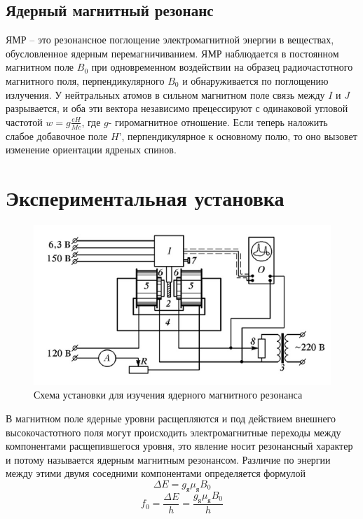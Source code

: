 \documentclass[a4paper, 12pt]{article}%
\begin{document}
\subsection{Ядерный магнитный резонанс}
ЯМР – это резонансное поглощение электромагнитной энергии в веществах, обусловленное ядерным перемагничиванием. ЯМР наблюдается в постоянном магнитном поле $B_0$ при одновременном воздействии на образец радиочастотного магнитного поля, перпендикулярного $B_0$ и обнаруживается по поглощению излучения. У нейтральных атомов в сильном магнитном поле связь между $I$ и $J$ разрывается, и оба эти вектора независимо прецессируют с одинаковой угловой частотой $w=g\frac{eH}{Mc}$, где $g$- гиромагнитное отношение. Если теперь наложить слабое добавочное поле $H’$, перпендикулярное к основному полю, то оно вызовет изменение ориентации ядреных спинов.

\section{Экспериментальная установка}
\begin{figure}[h]
\begin{center}
\includegraphics[width = \textwidth]{1.jpg}
\caption{Схема установки для изучения ядерного магнитного резонанса}
\end{center}
\end{figure}
В магнитном поле ядерные уровни расщепляются и под действием внешнего высокочастотного поля могут происходить электромагнитные переходы между компонентами расщепившегося уровня, это явление носит резонансный характер и потому называется ядерным магнитным резонансом. Различие по энергии между этими двумя соседними компонентами определяется формулой
\[\Delta E = g_{\text{я}}\mu_{\text{я}}B_0\]
\[f_0 = \frac{\Delta E }{h} = \frac{g_{\text{я}}\mu_{\text{я}}B_0}{h}\]
\end{document}
